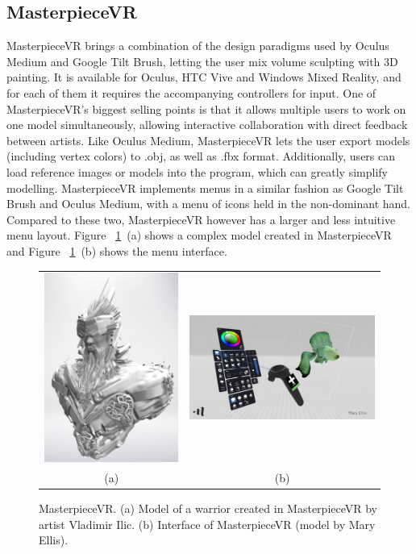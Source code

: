 \subsection{MasterpieceVR}
MasterpieceVR brings a combination of the design paradigms used by Oculus Medium and Google Tilt Brush, letting the user mix volume sculpting with 3D painting. It is available for Oculus, HTC Vive and Windows Mixed Reality, and for each of them it requires the accompanying controllers for input. One of MasterpieceVR's biggest selling points is that it allows multiple users to work on one model simultaneously, allowing interactive collaboration with direct feedback between artists. Like Oculus Medium, MasterpieceVR lets the user export models (including vertex colors) to .obj, as well as .fbx format. Additionally, users can load reference images or models into the program, which can greatly simplify modelling. MasterpieceVR implements menus in a similar fashion as Google Tilt Brush and Oculus Medium, with a menu of icons held in the non-dominant hand. Compared to these two, MasterpieceVR however has a larger and less intuitive menu layout. Figure ~\ref{fig:masterpieceVR}~(a) shows a complex model created in MasterpieceVR and Figure ~\ref{fig:masterpieceVR}~(b) shows the menu interface.

\begin{figure}[!h]
    \centering
    \setlength{\tabcolsep}{0.0130\linewidth}
    \begin{tabular}{@{}cc@{}}
   	\includegraphics[width=0.35\linewidth]{figures/MasterpieceVR_Vladimir_Ilic}&
   	\includegraphics[width=0.5\linewidth]{figures/MasterpieceVR_interface}\\
    (a)&(b)\\
    \end{tabular}
    \caption[MasterpieceVR]{MasterpieceVR.
    	  \textup{(a)} Model of a warrior created in MasterpieceVR by artist Vladimir Ilic.
			  \textup{(b)} Interface of MasterpieceVR (model by Mary Ellis). 
      \label{fig:masterpieceVR}}
\end{figure}

